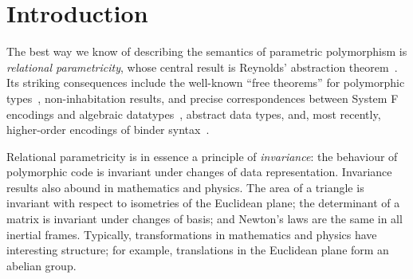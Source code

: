 \section{Introduction}
\label{sec:introduction}
The best way we know of describing the semantics of parametric
polymorphism is \emph{relational parametricity}, whose central result
is Reynolds' abstraction theorem~\cite{reynolds83types}. Its striking
consequences include the well-known ``free theorems'' for polymorphic
types~\cite{wadler89theorems}, non-inhabitation results, and precise
correspondences between System F encodings and algebraic
datatypes~\cite{PittsAM:parpoe}, abstract data types, and, most
recently, higher-order encodings of binder
syntax~\cite{syntaxforfree}.

Relational parametricity is in essence a principle of
\emph{invariance}: the behaviour of polymorphic code is invariant
under changes of data representation. Invariance results also abound in
mathematics and physics. The area of a triangle is invariant with
respect to isometries of the Euclidean plane; the determinant of a
matrix is invariant under changes of basis; and Newton's laws are the
same in all inertial frames. Typically, transformations in mathematics
and physics have interesting structure; for example, translations in
the Euclidean plane form an abelian group.




